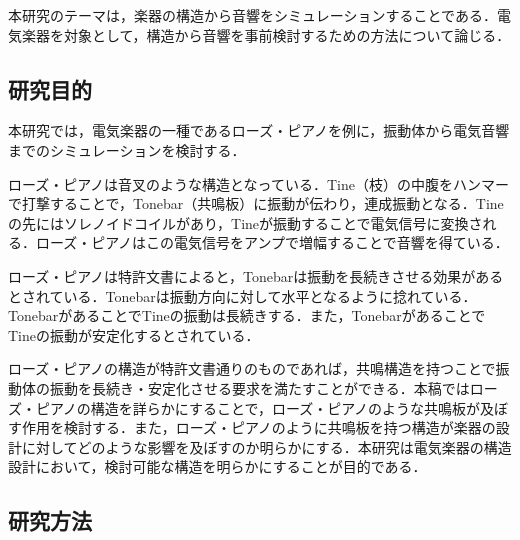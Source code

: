 本研究のテーマは，楽器の構造から音響をシミュレーションすることである．電気楽器を対象として，構造から音響を事前検討するための方法について論じる．

\subsection{研究目的}

本研究では，電気楽器の一種であるローズ・ピアノを例に，振動体から電気音響までのシミュレーションを検討する．

ローズ・ピアノは音叉のような構造となっている．Tine（枝）の中腹をハンマーで打撃することで，Tonebar（共鳴板）に振動が伝わり，連成振動となる．Tineの先にはソレノイドコイルがあり，Tineが振動することで電気信号に変換される．ローズ・ピアノはこの電気信号をアンプで増幅することで音響を得ている．

ローズ・ピアノは特許文書によると，Tonebarは振動を長続きさせる効果があるとされている．Tonebarは振動方向に対して水平となるように捻れている．TonebarがあることでTineの振動は長続きする．また，TonebarがあることでTineの振動が安定化するとされている．

ローズ・ピアノの構造が特許文書通りのものであれば，共鳴構造を持つことで振動体の振動を長続き・安定化させる要求を満たすことができる．本稿ではローズ・ピアノの構造を詳らかにすることで，ローズ・ピアノのような共鳴板が及ぼす作用を検討する．また，ローズ・ピアノのように共鳴板を持つ構造が楽器の設計に対してどのような影響を及ぼすのか明らかにする．本研究は電気楽器の構造設計において，検討可能な構造を明らかにすることが目的である．

\subsection{研究方法}


